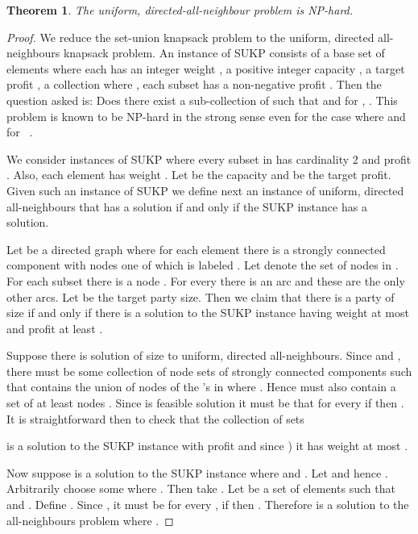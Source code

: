 \documentclass[12pt]{article}
\newtheorem{theorem}{Theorem}
\begin{document}
\begin{theorem} \label{thm:uniform-directed-all-hard}
The uniform, directed-all-neighbour problem is NP-hard.
\end{theorem}

\begin{proof}
We reduce the set-union knapsack problem to the uniform, directed
all-neighbours knapsack problem.  An instance of SUKP consists of a
base set of elements  where each  has
an integer weight , a positive integer capacity , a target
profit , a collection  where
, each subset  has a non-negative profit .
Then the question asked is: Does there exist a sub-collection
 of  such that
 and for ,
.  This problem is known to be NP-hard in
the strong sense even for the case where  and  for
~\cite{goldschmidt-etal:nrl1994}.

We consider instances of SUKP where
every subset  in  has cardinality 2 and profit .
Also, each element  has weight .
Let  be the capacity and  be the target profit.
Given such an instance of SUKP we define next an
instance of uniform, directed all-neighbours that has a solution if and only
if the SUKP instance has a solution.

Let  be a directed graph where for each element  there
is a strongly connected component  with  nodes one
of which is labeled .
Let  denote the set of nodes in .
For each subset  there is a node .
For every  there is an arc  and
these are the only other arcs.
Let  be the target party size.
Then we claim that there is a party of size  if and only
if there is a solution to the SUKP instance
having weight at most  and profit at least .

Suppose there is solution  of size  to uniform, directed all-neighbours.
Since  and , there must be some collection  of
node sets  of strongly connected components such
that  contains the union of nodes of the 's
in  where .
Hence  must also contain a set  of at least  nodes .
Since  is feasible solution it must be that for every 
if  then .
It is straightforward then to check that the collection of sets

is a solution to the SUKP instance
with profit  and
since )
it has weight at most .

Now suppose  is a solution
to the SUKP instance where  and
.
Let  and hence .
Arbitrarily choose some  where .
Then take .
Let  be a set of elements such that  and .
Define .
Since , it must be for every , if
 then .
Therefore  is a solution to the all-neighbours
problem where .
\end{proof}
\end{document}
